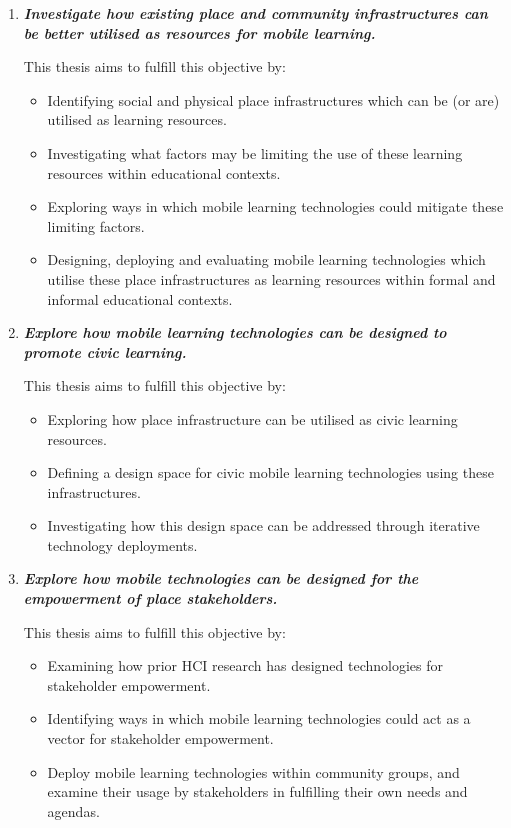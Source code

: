 \begin{enumerate}

\item \textit{\textbf{Investigate how existing place and community infrastructures can be better utilised as resources for mobile learning.}}

This thesis aims to fulfill this objective by:

\begin{itemize}
  \item Identifying social and physical place infrastructures which can be (or are) utilised as learning resources.
  \item Investigating what factors may be limiting the use of these learning resources within educational contexts.
  \item Exploring ways in which mobile learning technologies could mitigate these limiting factors.
  \item Designing, deploying and evaluating mobile learning technologies which utilise these place infrastructures as learning resources within formal and informal educational contexts.
\end{itemize}

\item \textit{\textbf{Explore how mobile learning technologies can be designed to promote civic learning.}}

This thesis aims to fulfill this objective by:

\begin{itemize}
  \item Exploring how place infrastructure can be utilised as civic learning resources.
  \item Defining a design space for civic mobile learning technologies using these infrastructures.
  \item Investigating how this design space can be addressed through iterative technology deployments.
\end{itemize}

\item \textit{\textbf{Explore how mobile technologies can be designed for the empowerment of place stakeholders.}}

This thesis aims to fulfill this objective by:

\begin{itemize}
  \item Examining how prior HCI research has designed technologies for stakeholder empowerment.
  \item Identifying ways in which mobile learning technologies could act as a vector for stakeholder empowerment.
  \item Deploy mobile learning technologies within community groups, and examine their usage by stakeholders in fulfilling their own needs and agendas.
\end{itemize}

\end{enumerate}

